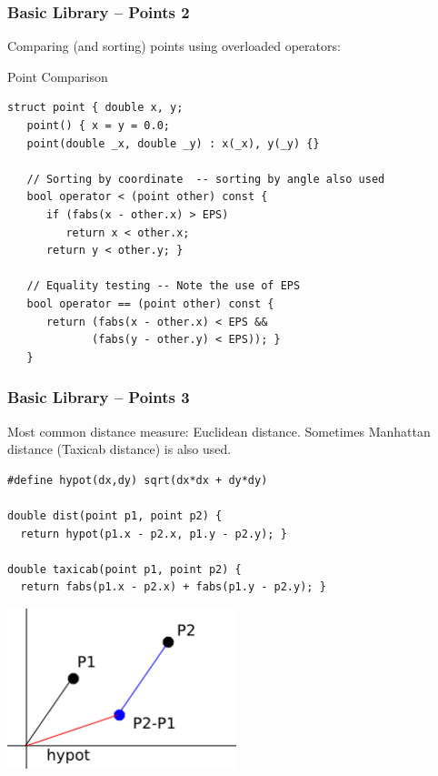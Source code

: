 \documentclass{beamer}
\begin{document}
\begin{frame}[fragile]
  \frametitle{Basic Library -- Points 2}

  {\smaller
    Comparing (and sorting) points using overloaded operators:
    
    \begin{exampleblock}{Point Comparison}
\begin{verbatim}
struct point { double x, y;
   point() { x = y = 0.0;
   point(double _x, double _y) : x(_x), y(_y) {}

   // Sorting by coordinate  -- sorting by angle also used
   bool operator < (point other) const {
      if (fabs(x - other.x) > EPS)
         return x < other.x;
      return y < other.y; }

   // Equality testing -- Note the use of EPS
   bool operator == (point other) const {
      return (fabs(x - other.x) < EPS &&  
             (fabs(y - other.y) < EPS)); }
   }
\end{verbatim}
    \end{exampleblock}
  }
\end{frame}

\begin{frame}[fragile]
  \frametitle{Basic Library -- Points 3}
  {\smaller

    Most common distance measure: Euclidean distance. Sometimes
    Manhattan distance (Taxicab distance) is also used.
    
    \begin{exampleblock}{}
\begin{verbatim}
#define hypot(dx,dy) sqrt(dx*dx + dy*dy)

double dist(point p1, point p2) {
  return hypot(p1.x - p2.x, p1.y - p2.y); }

double taxicab(point p1, point p2) {
  return fabs(p1.x - p2.x) + fabs(p1.y - p2.y); }
\end{verbatim}
    \end{exampleblock}

    \begin{center}
      \includegraphics[width=0.5\textwidth]{../img/geom1}
    \end{center}
  }
\end{frame}
  
\end{document}

